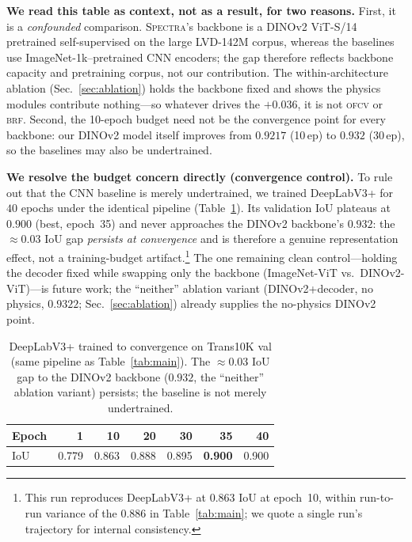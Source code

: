 \documentclass{article}
\newcommand{\spectra}{\textsc{Spectra}}
\newcommand{\ofcv}{\textsc{ofcv}}
\newcommand{\brf}{\textsc{brf}}
\newcommand{\dinov}{DINOv2}
\newcommand{\iou}{IoU}
\newcommand{\best}[1]{\textbf{#1}}
\begin{document}
\textbf{We read this table as context, not as a result, for two reasons.}
First, it is a \emph{confounded} comparison. \spectra{}'s backbone is a \dinov{}
ViT-S/14 pretrained self-supervised on the large LVD-142M corpus, whereas the
baselines use ImageNet-1k--pretrained CNN encoders; the gap therefore reflects
backbone capacity and pretraining corpus, not our contribution. The
within-architecture ablation (Sec.~\ref{sec:ablation}) holds the backbone fixed
and shows the physics modules contribute nothing---so whatever drives the
$+0.036$, it is not \ofcv{} or \brf. Second, the 10-epoch budget need not be the
convergence point for every backbone: our \dinov{} model itself improves from
$0.9217$ (10\,ep) to $0.932$ (30\,ep), so the baselines may also be undertrained.

\textbf{We resolve the budget concern directly (convergence control).} To rule
out that the CNN baseline is merely undertrained, we trained DeepLabV3+ for $40$
epochs under the identical pipeline (Table~\ref{tab:converge}). Its validation
\iou{} plateaus at $0.900$ (best, epoch~35) and never approaches the \dinov{}
backbone's $0.932$: the ${\approx}0.03$ \iou{} gap \emph{persists at
convergence} and is therefore a genuine representation effect, not a
training-budget artifact.\footnote{This run reproduces DeepLabV3+ at $0.863$
\iou{} at epoch~10, within run-to-run variance of the $0.886$ in
Table~\ref{tab:main}; we quote a single run's trajectory for internal
consistency.} The one remaining clean control---holding the decoder fixed while
swapping only the backbone (ImageNet-ViT vs.\ \dinov-ViT)---is future work; the
``neither'' ablation variant (\dinov{}+decoder, no physics, $0.9322$;
Sec.~\ref{sec:ablation}) already supplies the no-physics DINOv2 point.

\begin{table}[t]
\centering
\caption{DeepLabV3+ trained to convergence on Trans10K val (same pipeline as
Table~\ref{tab:main}). The ${\approx}0.03$ \iou{} gap to the \dinov{} backbone
($0.932$, the ``neither'' ablation variant) persists; the baseline is not merely
undertrained.}
\label{tab:converge}
\setlength{\tabcolsep}{5pt}
\begin{tabular}{lrrrrrr}
\toprule
Epoch & 1 & 10 & 20 & 30 & 35 & 40 \\
\midrule
\iou{} & 0.779 & 0.863 & 0.888 & 0.895 & \best{0.900} & 0.900 \\
\bottomrule
\end{tabular}
\end{table}
\end{document}
